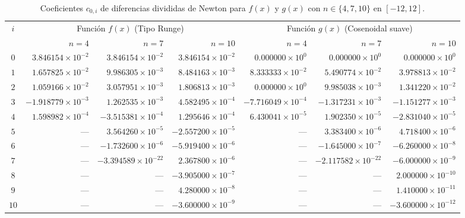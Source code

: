 \documentclass[11pt,letterpaper]{article}
\begin{document}
\begin{table}[H]
    \centering
    \caption{Coeficientes $c_{0,i}$ de diferencias divididas de Newton para $f(x)$ y $g(x)$ con $n \in \{4, 7, 10\}$ en $[-12, 12]$.}
    \label{tab:p2_coeficientes}
    \small
    \begin{tabular}{c|rrr|rrr}
        \toprule
        \multirow{2}{*}{$i$} & \multicolumn{3}{c|}{Función $f(x)$ (Tipo Runge)} & \multicolumn{3}{c}{Función $g(x)$ (Cosenoidal suave)} \\
        \cmidrule(lr){2-4} \cmidrule(lr){5-7}
         & $n = 4$ & $n = 7$ & $n = 10$ & $n = 4$ & $n = 7$ & $n = 10$ \\
        \midrule
        $0$  & $3.846154\times 10^{-2}$ & $3.846154\times 10^{-2}$ & $3.846154\times 10^{-2}$ & $0.000000\times 10^{0}$  & $0.000000\times 10^{0}$  & $0.000000\times 10^{0}$ \\
        $1$  & $1.657825\times 10^{-2}$ & $9.986305\times 10^{-3}$ & $8.484163\times 10^{-3}$ & $8.333333\times 10^{-2}$ & $5.490774\times 10^{-2}$ & $3.978813\times 10^{-2}$ \\
        $2$  & $1.059166\times 10^{-2}$ & $3.057951\times 10^{-3}$ & $1.806813\times 10^{-3}$ & $0.000000\times 10^{0}$  & $9.985038\times 10^{-3}$ & $1.341220\times 10^{-2}$ \\
        $3$  & $-1.918779\times 10^{-3}$ & $1.262535\times 10^{-3}$ & $4.582495\times 10^{-4}$ & $-7.716049\times 10^{-4}$ & $-1.317231\times 10^{-3}$ & $-1.151277\times 10^{-3}$ \\
        $4$  & $1.598982\times 10^{-4}$ & $-3.515381\times 10^{-4}$ & $1.295646\times 10^{-4}$ & $6.430041\times 10^{-5}$ & $1.902350\times 10^{-5}$ & $-2.831040\times 10^{-5}$ \\
        $5$  & --- & $3.564260\times 10^{-5}$ & $-2.557200\times 10^{-5}$ & --- & $3.383400\times 10^{-6}$ & $4.718400\times 10^{-6}$ \\
        $6$  & --- & $-1.732600\times 10^{-6}$ & $-5.919400\times 10^{-6}$ & --- & $-1.645000\times 10^{-7}$ & $-6.260000\times 10^{-8}$ \\
        $7$  & --- & $-3.394589\times 10^{-22}$ & $2.367800\times 10^{-6}$ & --- & $-2.117582\times 10^{-22}$ & $-6.000000\times 10^{-9}$ \\
        $8$  & --- & --- & $-3.905000\times 10^{-7}$ & --- & --- & $2.000000\times 10^{-10}$ \\
        $9$  & --- & --- & $4.280000\times 10^{-8}$ & --- & --- & $1.410000\times 10^{-11}$ \\
        $10$ & --- & --- & $-3.600000\times 10^{-9}$ & --- & --- & $-3.600000\times 10^{-12}$ \\
        \bottomrule
    \end{tabular}
\end{table}
\end{document}
